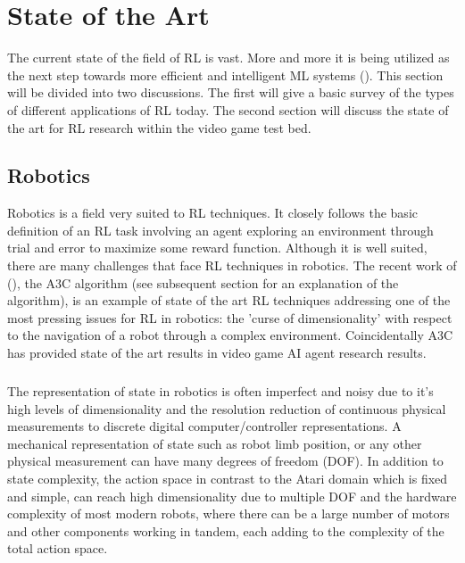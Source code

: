 \chapter{State of the Art}
The current state of the field of RL is vast. More and more it is being utilized as the next step towards more efficient and intelligent ML systems (\cite{survey-drl}). This section will be divided into two discussions. The first will give a basic survey of the types of different applications of RL today. The second section will discuss the state of the art for RL research within the video game test bed.

\section{Robotics}
Robotics is a field very suited to RL techniques. It closely follows the basic definition of an RL task involving an agent exploring an environment through trial and error to maximize some reward function. Although it is well suited, there are many challenges that face RL techniques in robotics. The recent work of (\cite{a3c}), the A3C algorithm (see subsequent section for an explanation of the algorithm), is an example of state of the art RL techniques addressing one of the most pressing issues for RL in robotics: the 'curse of dimensionality' with respect to the navigation of a robot through a complex environment. Coincidentally A3C has provided state of the art results in video game AI agent research results. \paragraph{}

The representation of state in robotics is often imperfect and noisy due to it's high levels of dimensionality and the resolution reduction of continuous physical measurements to discrete digital computer/controller representations. A mechanical representation of state such as robot limb position, or any other physical measurement can have many degrees of freedom (DOF). In addition to state complexity, the action space in contrast to the Atari domain which is fixed and simple, can reach high dimensionality due to multiple DOF and the hardware complexity of most modern robots, where there can be a large number of motors and other components working in tandem, each adding to the complexity of the total action space. \paragraph{}

